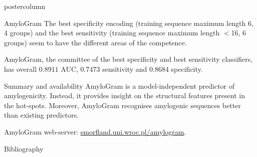 \documentclass[final]{beamer}\usepackage[]{graphicx}\usepackage[]{color}
\begin{document}
\begin{frame}
\begin{columns}
\begin{column}{.51\textwidth}
\begin{beamercolorbox}[center,wd=\textwidth]{postercolumn}
\begin{minipage}[T]{.95\textwidth}
{\begin{block}{AmyloGram}
The best specificity encoding (training sequence maximum length 6, 4 groups) and the best sensitivity (training sequence maximum length $<$16, 6 groups) seem to have the different areas of the competence.

AmyloGram, the committee of the best specificity and best sensitivity classifiers, has overall $0.8911$ AUC, $0.7473$ sensitivity and $0.8684$ specificity.
\end{block}
\vfill



\begin{block}{Summary and availability}
AmyloGram is a model-independent predictor of amylogenicity. Instead, it provides insight on the structural features present in the hot-spots. Moreover, AmyloGram recognises amylogenic sequences better than existing predictors.

\medskip

AmyloGram web-server: \url{smorfland.uni.wroc.pl/amylogram}.
\end{block}
\vfill


\begin{block}{Bibliography}
  \tiny{
  
  
  }
  \end{block}
  \vfill

}
\end{minipage}
\end{beamercolorbox}
\end{column}
\end{columns}  
\end{frame}
\end{document}
